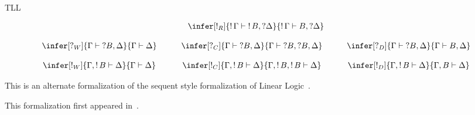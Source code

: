 \begin{entry}{TLL}
\begin{calculus}
\[\begin{array}{cccccccc}
  &&
  \infer[\bang_R]{\bang\Gamma\vdash \bang B,\quest\Delta}{\bang\Gamma\vdash B, \quest\Delta}\\
  \\
  \infer[\quest_W]{\Gamma\vdash \quest B,\Delta}{\Gamma\vdash \Delta}\quad
  &&
  \infer[\quest_C]{\Gamma\vdash \quest B,\Delta}{\Gamma\vdash \quest B,\quest B, \Delta}\quad
  &&
  \infer[\quest_D]{\Gamma\vdash \quest B,\Delta}{\Gamma\vdash B, \Delta}\\
  \\
  \infer[\bang_W]{\Gamma,\bang B\vdash \Delta}{\Gamma\vdash \Delta}\quad
  &&
  \infer[\bang_C]{\Gamma,\bang B\vdash \Delta}{\Gamma,\bang B,\bang B\vdash \Delta}\quad
  &&
  \infer[\bang_D]{\Gamma,\bang B\vdash \Delta}{\Gamma, B\vdash \Delta}
\end{array}
\]
\end{calculus}



\begin{clarifications}
This is an alternate formalization of the sequent style formalization
of Linear Logic~.
\end{clarifications}

\begin{history}
This formalization first appeared in~\cite{Troelstra:1992}.
\end{history}




\end{entry}
